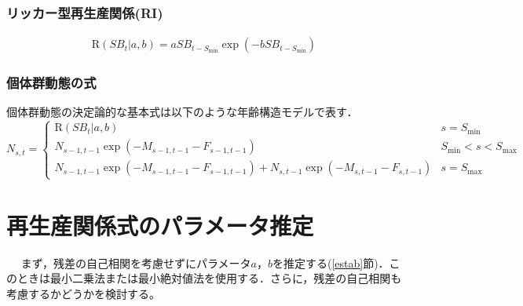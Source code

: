 \documentclass[11pt]{jsarticle}
\begin{document}
\subsubsection*{リッカー型再生産関係(RI)}
\begin{eqnarray}
  \mathrm{R}(S\!B_{t}|a,b) = a S\!B_{t-S_{\mathrm{min}}}   \exp{(-b S\!B_{t-S_{\mathrm{min}}})}
  \label{RI1}
\end{eqnarray}


\subsubsection*{個体群動態の式}
個体群動態の決定論的な基本式は以下のような年齢構造モデルで表す．
\begin{equation}
  N_{s,t} = \begin{cases}
    \mathrm{R}(S\!B_{t}|a,b)  &     s = S_\mathrm{min} \\    
    N_{s-1, t-1}  \exp(-M_{s-1,t-1}-F_{s-1,t-1} )  &    S_\mathrm{min} < s < S_\mathrm{max} \\
    N_{s-1, t-1}  \exp(-M_{s-1,t-1}-F_{s-1,t-1} ) + N_{s, t-1}  \exp(-M_{s,t-1}-F_{s,t-1}) &   s=S_{\mathrm{max}}
  \end{cases}
  \label{future_eq}
\end{equation}

\section{再生産関係式のパラメータ推定\label{SRest}}　
まず，残差の自己相関を考慮せずにパラメータ$a$，$b$を推定する(\ref{estab}節)．このときは最小二乗法または最小絶対値法を使用する．さらに，残差の自己相関も考慮するかどうかを検討する。
\end{document}
